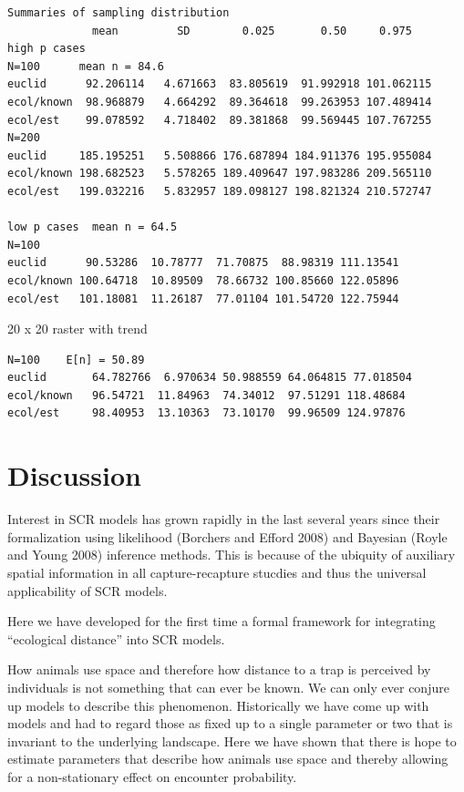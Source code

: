 \begin{verbatim}
Summaries of sampling distribution
             mean         SD        0.025       0.50     0.975
high p cases  
N=100      mean n = 84.6
euclid      92.206114   4.671663  83.805619  91.992918 101.062115 
ecol/known  98.968879   4.664292  89.364618  99.263953 107.489414 
ecol/est    99.078592   4.718402  89.381868  99.569445 107.767255 
N=200
euclid     185.195251   5.508866 176.687894 184.911376 195.955084 
ecol/known 198.682523   5.578265 189.409647 197.983286 209.565110 
ecol/est   199.032216   5.832957 189.098127 198.821324 210.572747 

low p cases  mean n = 64.5 
N=100
euclid      90.53286  10.78777  71.70875  88.98319 111.13541 
ecol/known 100.64718  10.89509  78.66732 100.85660 122.05896 
ecol/est   101.18081  11.26187  77.01104 101.54720 122.75944 

\end{verbatim}

20 x 20 raster with trend
\begin{verbatim}
N=100    E[n] = 50.89
euclid       64.782766  6.970634 50.988559 64.064815 77.018504 
ecol/known   96.54721  11.84963  74.34012  97.51291 118.48684 
ecol/est     98.40953  13.10363  73.10170  99.96509 124.97876 
\end{verbatim}


\section{Discussion}

Interest in SCR models has grown rapidly in the last several years
since their formalization using likelihood (Borchers and Efford 2008)
and Bayesian (Royle and Young 2008) inference methods. This is because
of the ubiquity of auxiliary spatial information in all
capture-recapture stucdies and thus the universal applicability of SCR
models.

Here we have developed for the first time a formal framework for integrating
``ecological distance'' into SCR models. 

How animals use space and therefore how distance to a trap is
perceived by individuals is not something that can ever be known. We
can only ever conjure up models to describe this
phenomenon. Historically we have come up with models and had to regard
those as fixed up to a single parameter or two that is invariant to
the underlying landscape. Here we have shown that there is hope to
estimate parameters that describe how animals use space and thereby
allowing for a non-stationary effect on encounter probability.


